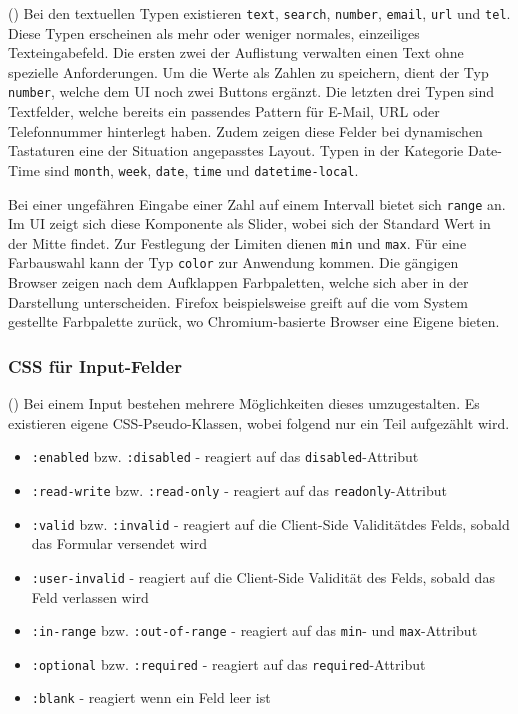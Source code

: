 (\cite{datalistMdn}) Bei den textuellen Typen existieren \texttt{text}, \texttt{search}, \texttt{number}, \texttt{email}, \texttt{url} und \texttt{tel}.
Diese Typen erscheinen als mehr oder weniger normales, einzeiliges Texteingabefeld.
Die ersten zwei der Auflistung verwalten einen Text ohne spezielle Anforderungen. 
Um die Werte als Zahlen zu speichern, dient der Typ \texttt{number}, welche dem UI noch zwei Buttons ergänzt.
Die letzten drei Typen sind Textfelder, welche bereits ein passendes Pattern für E-Mail, URL oder Telefonnummer hinterlegt haben.
Zudem zeigen diese Felder bei dynamischen Tastaturen eine der Situation angepasstes Layout\footnotemark.
Typen in der Kategorie Date-Time sind \texttt{month}, \texttt{week}, \texttt{date}, \texttt{time} und \texttt{datetime-local}.

Bei einer ungefähren Eingabe einer Zahl auf einem Intervall bietet sich \texttt{range} an.
Im UI zeigt sich diese Komponente als Slider, wobei sich der Standard Wert in der Mitte findet.
Zur Festlegung der Limiten dienen \texttt{min} und \texttt{max}.
Für eine Farbauswahl kann der Typ \texttt{color} zur Anwendung kommen. 
Die gängigen Browser zeigen nach dem Aufklappen Farbpaletten, welche sich aber in der Darstellung unterscheiden. 
Firefox beispielsweise greift auf die vom System gestellte Farbpalette zurück, wo Chromium-basierte Browser eine Eigene bieten.


\subsubsection{{\color{dgray} CSS für Input-Felder}}
\label{sec:inputCss}

(\cite{inputMdn}) Bei einem Input bestehen mehrere Möglichkeiten dieses umzugestalten.
Es existieren eigene CSS-Pseudo-Klassen, wobei folgend nur ein Teil aufgezählt wird.

\begin{itemize}
    \item \texttt{:enabled} bzw. \texttt{:disabled} - reagiert auf das \texttt{disabled}-Attribut
    \item \texttt{:read-write} bzw. \texttt{:read-only} - reagiert auf das \texttt{readonly}-Attribut
    \item \texttt{:valid} bzw. \texttt{:invalid} - reagiert auf die Client-Side Validität\footnotemark des Felds, sobald das Formular versendet wird
    \item \texttt{:user-invalid} - reagiert auf die Client-Side Validität des Felds, sobald das Feld verlassen wird
    \item \texttt{:in-range} bzw. \texttt{:out-of-range} - reagiert auf das \texttt{min}- und \texttt{max}-Attribut
    \item \texttt{:optional} bzw. \texttt{:required} - reagiert auf das \texttt{required}-Attribut
    \item \texttt{:blank} - reagiert wenn ein Feld leer ist
\end{itemize}

